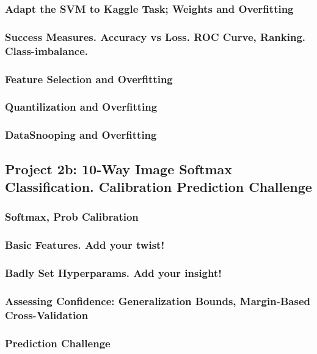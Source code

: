 \documentclass[12pt]{article}
\begin{document}
      \subsubsection*{Adapt the SVM to Kaggle Task; Weights and Overfitting}
      \subsubsection*{Success Measures.  Accuracy vs Loss.  ROC Curve, Ranking.  Class-imbalance.}
      \subsubsection*{Feature Selection and Overfitting}
      \subsubsection*{Quantilization and Overfitting}
      \subsubsection*{DataSnooping and Overfitting} %
    \newpage

    \subsection*{Project 2b: 10-Way Image Softmax Classification.  Calibration Prediction Challenge}
      \subsubsection*{Softmax, Prob Calibration}
      \subsubsection*{Basic Features.  Add your twist!}
      \subsubsection*{Badly Set Hyperparams.  Add your insight!}
      \subsubsection*{Assessing Confidence: Generalization Bounds, Margin-Based Cross-Validation}
      \subsubsection*{Prediction Challenge}
    \newpage
\end{document}
